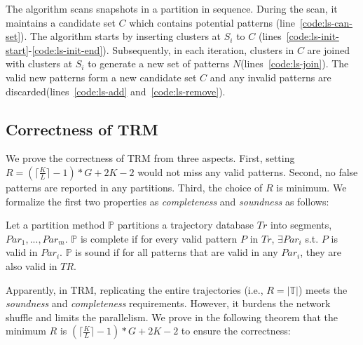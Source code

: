 The algorithm scans snapshots in a partition in sequence. During the scan, it
maintains a candidate set $C$ which contains potential patterns (line~\ref{code:ls-can-set}).
The algorithm starts by inserting clusters at $S_i$ to $C$ (lines~\ref{code:ls-init-start}-\ref{code:ls-init-end}).
Subsequently, in each iteration, clusters in $C$ are joined with clusters at $S_i$ to generate
a new set of patterns $N$(lines~\ref{code:ls-join}). The valid new patterns 
form a new candidate set $C$ and any invalid patterns are discarded(lines~\ref{code:ls-add} and~\ref{code:ls-remove}).


\subsection{Correctness of TRM}
We prove the correctness of TRM from three aspects. First,
setting $R = (\lceil \frac{K}{L} \rceil -1)*G+2K -2$
would not miss any valid patterns. Second, no false patterns
are reported in any partitions. Third, the choice of $R$ is
minimum. We formalize the first two 
properties as \emph{completeness} and \emph{soundness} as follows:

\begin{definition}
Let a partition method $\mathbb{P}$ partitions a trajectory database $Tr$ 
into segments, $Par_1,...,Par_m$. $\mathbb{P}$ is complete 
if for every valid pattern $P$ in $Tr$, $\exists Par_i$ s.t. $P$ is valid in $Par_i$. 
$\mathbb{P}$ is sound if for all patterns that are valid in any $Par_i$, they are also valid in $TR$.
\end{definition}

Apparently, in TRM, replicating the entire trajectories (i.e., $R=\mathbb{|T|}$)
meets the \emph{soundness} and \emph{completeness} requirements. However, it burdens the network shuffle and limits the parallelism. We prove in the following theorem 
that the minimum $R$ is $(\lceil \frac{K}{L} \rceil -1)*G+2K -2$ 
to ensure the correctness:


